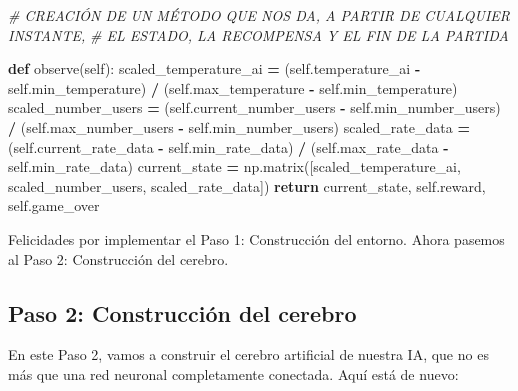 \documentclass[
]{book}
\newenvironment{Shaded}{\begin{snugshade}}{\end{snugshade}}
\newcommand{\CommentTok}[1]{\textcolor[rgb]{0.56,0.35,0.01}{\textit{#1}}}
\newcommand{\ControlFlowTok}[1]{\textcolor[rgb]{0.13,0.29,0.53}{\textbf{#1}}}
\newcommand{\KeywordTok}[1]{\textcolor[rgb]{0.13,0.29,0.53}{\textbf{#1}}}
\newcommand{\NormalTok}[1]{#1}
\newcommand{\OperatorTok}[1]{\textcolor[rgb]{0.81,0.36,0.00}{\textbf{#1}}}
\newcommand{\VariableTok}[1]{\textcolor[rgb]{0.00,0.00,0.00}{#1}}
\begin{document}
\begin{Shaded}
\begin{Highlighting}[]
    \CommentTok{\# CREACIÓN DE UN MÉTODO QUE NOS DA, A PARTIR DE CUALQUIER INSTANTE, }
    \CommentTok{\# EL ESTADO, LA RECOMPENSA Y EL FIN DE LA PARTIDA}
    
    \KeywordTok{def}\NormalTok{ observe(}\VariableTok{self}\NormalTok{):}
\NormalTok{        scaled\_temperature\_ai }\OperatorTok{=}\NormalTok{ (}\VariableTok{self}\NormalTok{.temperature\_ai }\OperatorTok{{-}} \VariableTok{self}\NormalTok{.min\_temperature)}
                                \OperatorTok{/}\NormalTok{ (}\VariableTok{self}\NormalTok{.max\_temperature }\OperatorTok{{-}} \VariableTok{self}\NormalTok{.min\_temperature)}
\NormalTok{        scaled\_number\_users }\OperatorTok{=}\NormalTok{ (}\VariableTok{self}\NormalTok{.current\_number\_users }\OperatorTok{{-}} \VariableTok{self}\NormalTok{.min\_number\_users)}
                              \OperatorTok{/}\NormalTok{ (}\VariableTok{self}\NormalTok{.max\_number\_users }\OperatorTok{{-}} \VariableTok{self}\NormalTok{.min\_number\_users)}
\NormalTok{        scaled\_rate\_data }\OperatorTok{=}\NormalTok{ (}\VariableTok{self}\NormalTok{.current\_rate\_data }\OperatorTok{{-}} \VariableTok{self}\NormalTok{.min\_rate\_data)}
                           \OperatorTok{/}\NormalTok{ (}\VariableTok{self}\NormalTok{.max\_rate\_data }\OperatorTok{{-}} \VariableTok{self}\NormalTok{.min\_rate\_data)}
\NormalTok{        current\_state }\OperatorTok{=}\NormalTok{ np.matrix([scaled\_temperature\_ai,}
\NormalTok{                                   scaled\_number\_users,}
\NormalTok{                                   scaled\_rate\_data])}
        \ControlFlowTok{return}\NormalTok{ current\_state, }\VariableTok{self}\NormalTok{.reward, }\VariableTok{self}\NormalTok{.game\_over}
\end{Highlighting}
\end{Shaded}

Felicidades por implementar el Paso 1: Construcción del entorno. Ahora pasemos al Paso 2: Construcción del cerebro.

\hypertarget{paso-2-construcciuxf3n-del-cerebro}{%
\subsection{Paso 2: Construcción del cerebro}\label{paso-2-construcciuxf3n-del-cerebro}}

En este Paso 2, vamos a construir el cerebro artificial de nuestra IA, que no es más que una red neuronal completamente conectada. Aquí está de nuevo:
\end{document}
